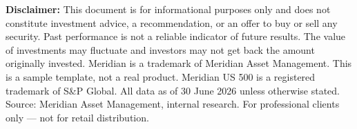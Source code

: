 \documentclass[11pt,a4paper]{article}
\begin{document}
\vspace{6pt}

\begin{tcolorbox}[
  colback=ice!80,
  colframe=ice!80,
  arc=2pt,
  boxrule=0pt,
  left=8pt,
  right=8pt,
  top=6pt,
  bottom=6pt,
  before skip=8pt,
  fontupper=\fontsize{7.2}{9}\selectfont\color{slate}
]
\textbf{Disclaimer:} This document is for informational purposes only and does not constitute
investment advice, a recommendation, or an offer to buy or sell any security. Past performance
is not a reliable indicator of future results. The value of investments may fluctuate and
investors may not get back the amount originally invested. Meridian\texttrademark
is a trademark of Meridian Asset Management. This is a sample template, not a real product.
Meridian US 500 is a registered trademark of S\&P Global. All data
as of 30 June 2026 unless otherwise stated. Source: Meridian Asset Management, internal research.
For professional clients only --- not for retail distribution.
\end{tcolorbox}
\end{document}
